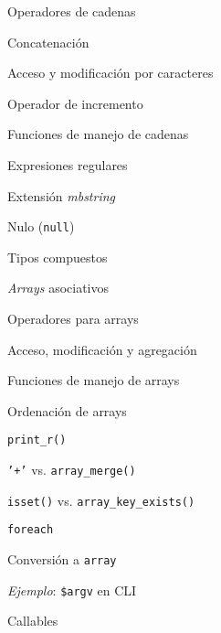 \begin{longenum}
\begin{longenum}
\begin{longenum}
\begin{longenum}
                \item Operadores de cadenas
                \begin{longenum}
                    \item Concatenación
                    \item Acceso y modificación por caracteres
                    \item Operador de incremento \opcional
                \end{longenum}
                \item Funciones de manejo de cadenas
                \item Expresiones regulares
                \item Extensión \textit{mbstring}
            \end{longenum}
            \item Nulo (\texttt{null})
        \end{longenum}
        \item Tipos compuestos
        \begin{longenum}
            \item \textit{Arrays} asociativos
            \begin{longenum}
                \item Operadores para arrays
                \begin{longenum}
                    \item Acceso, modificación y agregación
                \end{longenum}
                \item Funciones de manejo de arrays
                \begin{longenum}
                    \item Ordenación de arrays
                    \item \texttt{print\_r()}
                    \item \texttt{'+'} vs. \texttt{array\_merge()}
                    \item \texttt{isset()} vs. \texttt{array\_key\_exists()}
                \end{longenum}
                \item \texttt{foreach}
                \item Conversión a \texttt{array}
                \item \textit{Ejemplo}: \texttt{\$argv} en CLI
            \end{longenum}
            \item Callables

\end{longenum}
\end{longenum}
\end{longenum}
